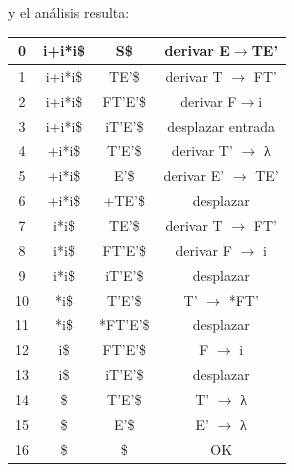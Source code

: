 \documentclass{apuntes}
\begin{document}
\begin{example}
y el análisis resulta:
\begin{center}
\begin{tabular}{| c | c | c | c |}
\hline
0 & i+i*i\$ & S\$ & derivar E$\rightarrow$TE' \\
\hline
1 & i+i*i\$ &  TE'\$ & derivar T $\rightarrow$ FT' \\
\hline
2 & i+i*i\$ &  FT'E'\$ & derivar F$\rightarrow$i \\
\hline
3 & i+i*i\$ &  iT'E'\$ & desplazar entrada \\
\hline
4 & +i*i\$ &  T'E'\$ & derivar T' $\rightarrow$ λ \\
\hline
5 & +i*i\$ &  E'\$ & derivar E' $\rightarrow$ TE' \\
\hline
6 & +i*i\$ &  +TE'\$ & desplazar \\
\hline
7 & i*i\$ &  TE'\$ & derivar T $\rightarrow$ FT' \\
\hline
8 & i*i\$ &  FT'E'\$ & derivar F $\rightarrow$ i \\
\hline
9 & i*i\$ &  iT'E'\$ & desplazar \\
\hline
10 & *i\$ &  T'E'\$ & T' $\rightarrow$ *FT' \\
\hline
11 & *i\$ &  *FT'E'\$ & desplazar \\
\hline
12 & i\$ &  FT'E'\$ & F $\rightarrow$ i \\
\hline
13 & i\$ &  iT'E'\$ & desplazar \\
\hline
14 & \$ &  T'E'\$ & T' $\rightarrow$ λ \\
\hline
15 & \$ &  E'\$ & E' $\rightarrow$ λ \\
\hline
16 & \$ &  \$ & OK \\
\hline
\end{tabular}
\end{center}
\end{example}
\end{document}
